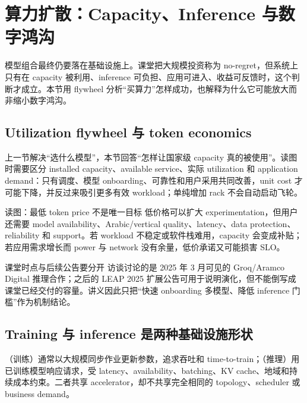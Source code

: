 \section{算力扩散：Capacity、Inference 与数字鸿沟}

模型组合最终仍要落在基础设施上。课堂把大规模投资称为 no-regret，但系统上只有在 capacity 被利用、inference 可负担、应用可进入、收益可反馈时，这个判断才成立。本节用 flywheel 分析“买算力”怎样成功，也解释为什么它可能放大而非缩小数字鸿沟。

\subsection{Utilization flywheel 与 token economics}

上一节解决“选什么模型”，本节回答“怎样让国家级 capacity 真的被使用”。读图时需要区分 installed capacity、available service、实际 utilization 和 application demand：只有调度、模型 onboarding、可靠性和用户采用共同改善，unit cost 才可能下降，并反过来吸引更多有效 workload；单纯增加 rack 不会自动启动飞轮。


\begin{knowledgebox}{读图：最低 token price 不是唯一目标}
低价格可以扩大 experimentation，但用户还需要 model availability、Arabic/vertical quality、latency、data protection、reliability 和 support。若 workload 不稳定或软件栈难用，capacity 会变成补贴；若应用需求增长而 power 与 network 没有余量，低价承诺又可能损害 SLO。
\end{knowledgebox}

\begin{warningbox}{课堂时点与后续公告要分开}
访谈讨论的是 2025 年 3 月可见的 Groq/Aramco Digital 推理合作；之后的 LEAP 2025 扩展公告可用于说明演化，但不能倒写成课堂已经交付的容量。讲义因此只把“快速 onboarding 多模型、降低 inference 门槛”作为机制结论。
\end{warningbox}

\subsection{Training 与 inference 是两种基础设施形状}

（训练）通常以大规模同步作业更新参数，追求吞吐和 time-to-train；（推理）用已训练模型响应请求，受 latency、availability、batching、KV cache、地域和持续成本约束。二者共享 accelerator，却不共享完全相同的 topology、scheduler 或 business demand。

